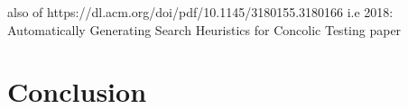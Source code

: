 \documentclass[	runningheads,
				a4paper]{llncs}
\begin{document}
also of https://dl.acm.org/doi/pdf/10.1145/3180155.3180166
i.e 2018: Automatically Generating Search Heuristics for Concolic Testing paper


\section{Conclusion}







	
\end{document}
